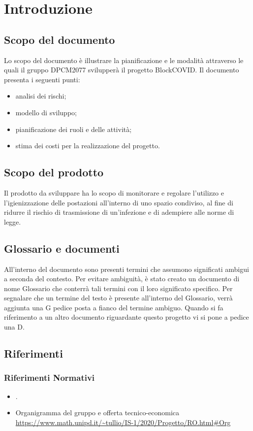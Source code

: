 \section{Introduzione}

\subsection{Scopo del documento}
Lo scopo del documento è illustrare la pianificazione e le modalità attraverso le quali il gruppo DPCM2077 svilupperà il progetto BlockCOVID.
Il documento presenta i seguenti punti:
\begin{itemize}
	\item analisi dei rischi;
	\item modello di sviluppo;
	\item pianificazione dei ruoli e delle attività;
	\item stima dei costi per la realizzazione del progetto.
\end{itemize}

\subsection{Scopo del prodotto}
Il prodotto da sviluppare ha lo scopo di monitorare e regolare l'utilizzo e l'igienizzazione delle postazioni all'interno di uno spazio condiviso, al fine di ridurre il rischio di trasmissione di un'infezione e di adempiere alle norme di legge. 
\subsection{Glossario e documenti} 
All'interno del  documento sono presenti termini che assumono significati ambigui a seconda del contesto.
Per evitare ambiguità, è stato creato un  documento di nome Glossario che  conterrà tali termini con il loro significato specifico. Per segnalare che un termine del testo è presente all'interno del Glossario, verrà aggiunta una G pedice posta a fianco del termine ambiguo.
Quando si fa riferimento a un altro documento riguardante questo progetto vi si pone a pedice una D.

\subsection{Riferimenti}
\subsubsection{Riferimenti Normativi}
\begin{itemize}
	\item {}.
    \item{Organigramma del gruppo e offerta tecnico-economica} \\
 \url{https://www.math.unipd.it/~tullio/IS-1/2020/Progetto/RO.html#Org}
\end{itemize}
